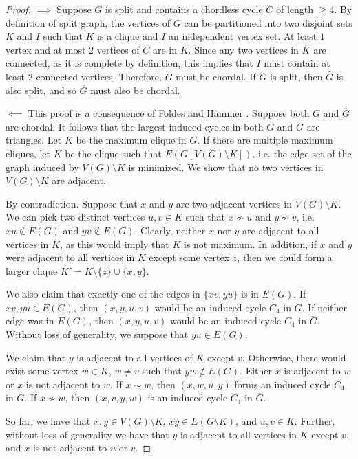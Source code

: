 \documentclass[11pt]{article}
\theoremstyle{definition}
\begin{document}
\begin{proof} 
$\implies$ Suppose $G$ is split and contains a chordless cycle $C$ of length $\geq 4$. By definition of split graph, the vertices of $G$ can be partitioned into two disjoint sets $K$ and $I$ such that $K$ is a clique and $I$ an independent vertex set. At least $1$ vertex and at most $2$ vertices of $C$ are in $K$. Since any two vertices in $K$ are connected, as it is complete by definition, this implies that $I$ must contain at least $2$ connected vertices. Therefore, $G$ must be chordal. If $G$ is split, then $\overline{G}$ is also split, and so $\overline{G}$ must also be chordal. 

$\impliedby$ This proof is a consequence of Foldes and Hammer \cite{zbMATH03632548}. Suppose both $G$ and $\overline{G}$ are chordal. It follows that the largest induced cycles in both $G$ and $\overline{G}$ are triangles. Let $K$ be the maximum clique in $G$. If there are multiple maximum cliques, let $K$ be the clique such that $E(G[V(G)\setminus K])$, i.e. the edge set of the graph induced by $V(G)\setminus K$ is minimized. We show that no two vertices in $V(G)\setminus K$ are adjacent.

By contradiction. Suppose that $x$ and $y$ are two adjacent vertices in $V(G)\setminus K$. We can pick two distinct vertices $u, v \in K$ such that $x \not\sim u$ and $y \not\sim v$, i.e. $xu \not\in E(G)$ and $yv \not\in E(G)$. Clearly, neither $x$ nor $y$ are adjacent to all vertices in $K$, as this would imply that $K$ is not maximum. In addition, if $x$ and $y$ were adjacent to all vertices in $K$ except some vertex $z$, then we could form a larger clique $K' = K \setminus \{z\} \cup \{x, y\}$. 

We also claim that exactly one of the edges in $\{ xv, yu\}$ is in $E(G)$. If $xv, yu \in E(G)$, then $(x, y, u, v)$ would be an induced cycle $C_4$ in $G$. If neither edge was in $E(G)$, then $(x, y, u, v)$ would be an induced cycle $C_4$ in $\overline{G}$. Without loss of generality, we suppose that $yu \in E(G)$.

We claim that $y$ is adjacent to all vertices of $K$ except $v$. Otherwise, there would exist some vertex $w \in K$, $w \neq v$ such that $yw \not\in E(G)$. Either $x$ is adjacent to $w$ or $x$ is not adjacent to $w$. If $x \sim w$, then $(x, w, u, y)$ forms an induced cycle $C_4$ in $G$. If $x \not\sim w$, then $(x, v, y, w)$ is an induced cycle $C_4$ in $\overline{G}$.

So far, we have that $x, y \in V(G) \setminus K$, $xy \in E(G \setminus K)$, and $u, v \in K$. Further, without loss of generality we have that $y$ is adjacent to all vertices in $K$ except $v$, and $x$ is not adjacent to $u$ or $v$.


\end{proof}
\end{document}
